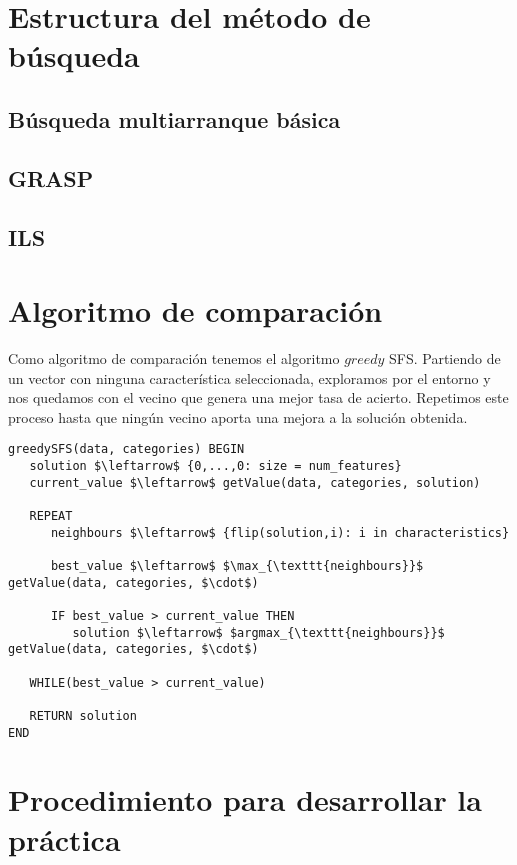 \documentclass[11pt,leqno]{article}
\begin{document}
\section{Estructura del método de búsqueda}

\subsection{Búsqueda multiarranque básica}


\subsection{GRASP}


	
\subsection{ILS}

	

\section{Algoritmo de comparación}

Como algoritmo de comparación tenemos el algoritmo $\textit{greedy}$ SFS. Partiendo de un vector con ninguna característica seleccionada, exploramos por el entorno y nos quedamos con el vecino que genera una mejor tasa de acierto. Repetimos este proceso hasta que ningún vecino aporta una mejora a la solución obtenida.

	\begin{lstlisting}[mathescape=true]
greedySFS(data, categories) BEGIN
   solution $\leftarrow$ {0,...,0: size = num_features}
   current_value $\leftarrow$ getValue(data, categories, solution)
   
   REPEAT
      neighbours $\leftarrow$ {flip(solution,i): i in characteristics}
   
      best_value $\leftarrow$ $\max_{\texttt{neighbours}}$ getValue(data, categories, $\cdot$)
      
      IF best_value > current_value THEN
         solution $\leftarrow$ $argmax_{\texttt{neighbours}}$ getValue(data, categories, $\cdot$)
   
   WHILE(best_value > current_value)
   
   RETURN solution
END
	\end{lstlisting}


\section{Procedimiento para desarrollar la práctica}
\end{document}
